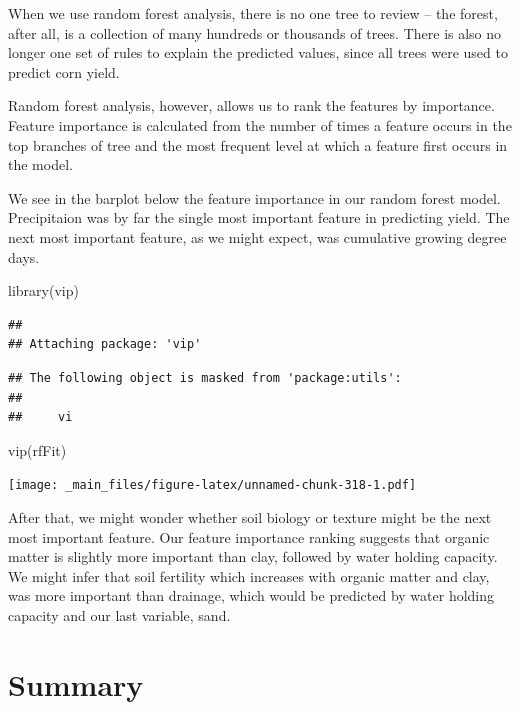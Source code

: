 \documentclass[
]{book}
\newenvironment{Shaded}{\begin{snugshade}}{\end{snugshade}}
\newcommand{\FunctionTok}[1]{\textcolor[rgb]{0.00,0.00,0.00}{#1}}
\newcommand{\NormalTok}[1]{#1}
\begin{document}
When we use random forest analysis, there is no one tree to review -- the forest, after all, is a collection of many hundreds or thousands of trees. There is also no longer one set of rules to explain the predicted values, since all trees were used to predict corn yield.

Random forest analysis, however, allows us to rank the features by importance. Feature importance is calculated from the number of times a feature occurs in the top branches of tree and the most frequent level at which a feature first occurs in the model.

We see in the barplot below the feature importance in our random forest model. Precipitaion was by far the single most important feature in predicting yield. The next most important feature, as we might expect, was cumulative growing degree days.

\begin{Shaded}
\begin{Highlighting}[]
\FunctionTok{library}\NormalTok{(vip)}
\end{Highlighting}
\end{Shaded}

\begin{verbatim}
## 
## Attaching package: 'vip'
\end{verbatim}

\begin{verbatim}
## The following object is masked from 'package:utils':
## 
##     vi
\end{verbatim}

\begin{Shaded}
\begin{Highlighting}[]
\FunctionTok{vip}\NormalTok{(rfFit)}
\end{Highlighting}
\end{Shaded}

\texttt{[image: \_main\_files/figure-latex/unnamed-chunk-318-1.pdf]}

After that, we might wonder whether soil biology or texture might be the next most important feature. Our feature importance ranking suggests that organic matter is slightly more important than clay, followed by water holding capacity. We might infer that soil fertility which increases with organic matter and clay, was more important than drainage, which would be predicted by water holding capacity and our last variable, sand.

\hypertarget{summary-2}{%
\section{Summary}\label{summary-2}}
\end{document}
